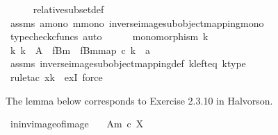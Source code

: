 \begin{isabellebody}
\ \ \ \ \isamarkupfalse%
\ relative{\isacharunderscore}{\kern0pt}subset{\isacharunderscore}{\kern0pt}def{}\ \isanewline
\ \ \ \ \isamarkupfalse%
\ assms\ a{\isacharunderscore}{\kern0pt}mono\ m{\isacharunderscore}{\kern0pt}mono\ inverse{\isacharunderscore}{\kern0pt}image{\isacharunderscore}{\kern0pt}subobject{\isacharunderscore}{\kern0pt}mapping{\isacharunderscore}{\kern0pt}mono\isanewline
\ \ \isamarkupfalse%
\ {\isacharparenleft}{\kern0pt}typecheck{\isacharunderscore}{\kern0pt}cfuncs{\isacharcomma}{\kern0pt}\ auto{\isacharparenright}{\kern0pt}\isanewline
\ \ \ \ \isamarkupfalse%
\ {\isachardoublequoteopen}monomorphism\ k{\isachardoublequoteclose}\isanewline
\ \ \ \ \isamarkupfalse%
\ \isamarkupfalse%
\ {\isachardoublequoteopen}{\isasymexists}k{\isachardot}{\kern0pt}\ k\ {\isacharcolon}{\kern0pt}\ A\ {\isasymrightarrow}\ f\isactrlsup {\isacharminus}{\kern0pt}B{\isasymrparr}\isactrlbsub m\isactrlesub \ {\isasymand}\ {\isacharbrackleft}{\kern0pt}f\isactrlsup {\isacharminus}{\kern0pt}B{\isasymrparr}\isactrlbsub m\isactrlesub {\isacharbrackright}{\kern0pt}map\ {\isasymcirc}\isactrlsub c\ k\ {\isacharequal}{\kern0pt}\ a{\isachardoublequoteclose}\isanewline
\ \ \ \ \ \ \isamarkupfalse%
\ assms{\isacharparenleft}{\kern0pt}{}{\isacharparenright}{\kern0pt}\ inverse{\isacharunderscore}{\kern0pt}image{\isacharunderscore}{\kern0pt}subobject{\isacharunderscore}{\kern0pt}mapping{\isacharunderscore}{\kern0pt}def{}\ k{\isacharunderscore}{\kern0pt}left{\isacharunderscore}{\kern0pt}eq\ k{\isacharunderscore}{\kern0pt}type\ \isanewline
\ \ \ \ \ \ \isamarkupfalse%
\ {\isacharparenleft}{\kern0pt}rule{\isacharunderscore}{\kern0pt}tac\ x{\isacharequal}{\kern0pt}k\ \ exI{\isacharcomma}{\kern0pt}\ force{\isacharparenright}{\kern0pt}\isanewline
\ \ \isamarkupfalse%
\isanewline
{}\isamarkupfalse%
%
\endisatagproof
{\isafoldproof}%
%
\isadelimproof
%
\endisadelimproof
%
\begin{isamarkuptext}%
The lemma below corresponds to Exercise 2.3.10 in Halvorson.%
\end{isamarkuptext}\isamarkuptrue%
\isamarkupfalse%
\ in{\isacharunderscore}{\kern0pt}inv{\isacharunderscore}{\kern0pt}image{\isacharunderscore}{\kern0pt}of{\isacharunderscore}{\kern0pt}image{\isacharcolon}{\kern0pt}\isanewline
\ \ \ {\isachardoublequoteopen}{\isacharparenleft}{\kern0pt}A{\isacharcomma}{\kern0pt}m{\isacharparenright}{\kern0pt}\ {\isasymsubseteq}\isactrlsub c\ X{\isachardoublequoteclose}\ \isanewline

\end{isabellebody}

